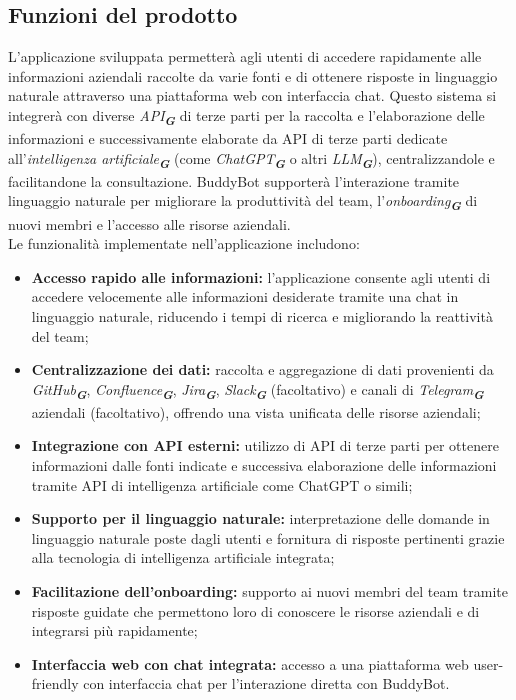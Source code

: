 \subsection{Funzioni del prodotto}
L'applicazione sviluppata permetterà agli utenti di accedere rapidamente alle informazioni aziendali raccolte da varie 
fonti e di ottenere risposte in linguaggio naturale attraverso una piattaforma web con interfaccia chat. Questo sistema 
si integrerà con diverse \emph{API}\textsubscript{\textit{\textbf{G}}}  di terze parti per la raccolta e l'elaborazione delle informazioni e successivamente elaborate
da API  di terze parti dedicate all'\emph{intelligenza artificiale}\textsubscript{\textit{\textbf{G}}}  (come \emph{ChatGPT}\textsubscript{\textit{\textbf{G}}} o altri \emph{LLM}\textsubscript{\textit{\textbf{G}}}), centralizzandole e facilitandone la consultazione. 
BuddyBot supporterà l'interazione tramite linguaggio naturale per migliorare la produttività del team, l'\emph{onboarding}\textsubscript{\textit{\textbf{G}}} di nuovi 
membri e l'accesso alle risorse aziendali.\\
Le funzionalità implementate nell'applicazione includono:
\begin{itemize}
    \item \textbf{Accesso rapido alle informazioni:} l'applicazione consente agli utenti di accedere velocemente alle informazioni desiderate tramite una chat in linguaggio naturale, riducendo i tempi di ricerca e migliorando la reattività del team;
    \item \textbf{Centralizzazione dei dati:} raccolta e aggregazione di dati provenienti da \emph{GitHub}\textsubscript{\textit{\textbf{G}}}, \emph{Confluence}\textsubscript{\textit{\textbf{G}}}, \emph{Jira}\textsubscript{\textit{\textbf{G}}}, \emph{Slack}\textsubscript{\textit{\textbf{G}}} (facoltativo) e canali di \emph{Telegram}\textsubscript{\textit{\textbf{G}}} aziendali (facoltativo), offrendo una vista unificata delle risorse aziendali;
    \item \textbf{Integrazione con API esterni:} utilizzo di API di terze parti per ottenere informazioni dalle fonti indicate e successiva elaborazione delle informazioni tramite API di intelligenza artificiale come ChatGPT o simili;
    \item \textbf{Supporto per il linguaggio naturale:} interpretazione delle domande in linguaggio naturale poste dagli utenti e fornitura di risposte pertinenti grazie alla tecnologia di intelligenza artificiale integrata;
    \item \textbf{Facilitazione dell'onboarding:} supporto ai nuovi membri del team tramite risposte guidate che permettono loro di conoscere le risorse aziendali e di integrarsi più rapidamente;
    \item \textbf{Interfaccia web con chat integrata:} accesso a una piattaforma web user-friendly con interfaccia chat per l'interazione diretta con BuddyBot.
\end{itemize}

